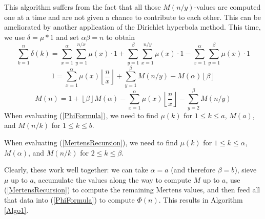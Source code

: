 \documentclass[12pt]{article}
\newcommand{\eqn}[1]{\begin{displaymath} #1 \end{displaymath}}
\newcommand{\neqn}[1]{\begin{equation} #1 \end{equation}}
\newcommand{\floor}[1]{{\left\lfloor #1 \right\rfloor}}
\newcommand{\floordiv}[2]{\floor{\frac{#1}{#2}}}
\begin{document}
This algorithm suffers from the fact that all those $M(n/y)$-values are computed one at a time and are not given a chance to contribute to each other.  This can be ameliorated by another application of the Dirichlet hyperbola method.  This time, we use $\delta = \mu * 1$ and set $\alpha\beta=n$ to obtain
\eqn{\sum_{k=1}^n \delta(k) = \sum_{x=1}^{\alpha}\sum_{y=1}^{n/x} \mu(x) \cdot 1 + \sum_{y=1}^{\beta}\sum_{x=1}^{n/y} \mu(x) \cdot 1 - \sum_{x=1}^{\alpha}\sum_{y=1}^{\beta} \mu(x) \cdot 1}
\eqn{1 = \sum_{x=1}^{\alpha} \mu(x) \floordiv{n}{x} + \sum_{y=1}^{\beta} M(n/y) - M(\alpha) \floor{\beta}}
\neqn{M(n) = 1 + \floor{\beta} M(\alpha) - \sum_{x=1}^{\alpha} \mu(x) \floordiv{n}{x} - \sum_{y=2}^{\beta} M(n/y) \label{MertensRecursion}}
When evaluating (\ref{PhiFormula}), we need to find $\mu(k)$ for $1 \leq k \leq a$, $M(a)$, and $M(n/k)$ for $1 \leq k \leq b$.

When evaluating (\ref{MertensRecursion}), we need to find $\mu(k)$ for $1 \leq k \leq \alpha$, $M(\alpha)$, and $M(n/k)$ for $2 \leq k \leq \beta$.

Clearly, these work well together: we can take $\alpha=a$ (and therefore $\beta=b$), sieve $\mu$ up to $a$, accumulate the values along the way to compute $M$ up to $a$, use (\ref{MertensRecursion}) to compute the remaining Mertens values, and then feed all that data into (\ref{PhiFormula}) to compute $\Phi(n)$.  This results in Algorithm \ref{Algo1}.
\end{document}
